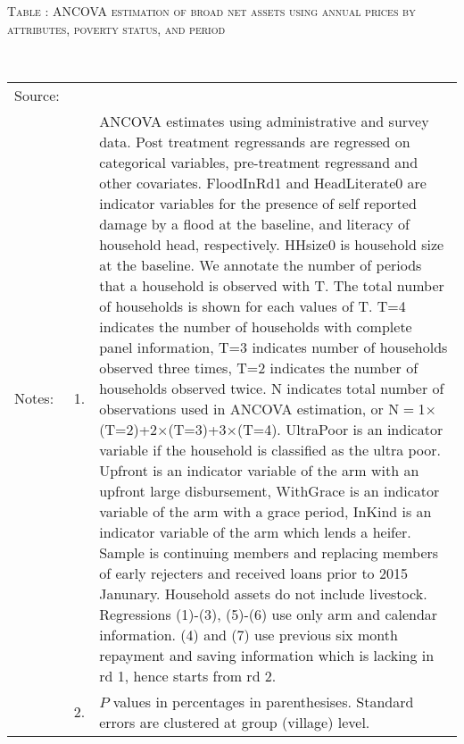 \hspace{-1cm}\begin{minipage}[t]{14cm}
\hfil\textsc{\normalsize Table \thetable: ANCOVA estimation of broad net assets using annual prices by attributes, poverty status, and period\label{tab ANCOVA net assets using annual prices timevarying poverty status attributes}}\\
\setlength{\tabcolsep}{1pt}
\setlength{\baselineskip}{8pt}
\renewcommand{\arraystretch}{.55}
\hfil{}\\
\renewcommand{\arraystretch}{.8}
\setlength{\tabcolsep}{1pt}
\begin{tabular}{>{\hfill\scriptsize}p{1cm}<{}>{\hfill\scriptsize}p{.25cm}<{}>{\scriptsize}p{12cm}<{\hfill}}
Source:& \multicolumn{2}{l}{\scriptsize Estimated with GUK administrative and survey data.}\\
Notes: & 1. & ANCOVA estimates using administrative and survey data. Post treatment regressands are regressed on categorical variables, pre-treatment regressand and other covariates. \textsf{FloodInRd1} and \textsf{HeadLiterate0} are indicator variables for the presence of self reported damage by a flood at the baseline, and literacy of household head, respectively. \textsf{HHsize0} is household size at the baseline. We annotate the number of periods that a household is observed with \textsf{T}. The total number of households is shown for each values of \textsf{T}. \textsf{T=4} indicates the number of households with complete panel information, \textsf{T=3} indicates number of households observed three times, \textsf{T=2} indicates the number of households observed twice. \textsf{N} indicates total number of observations used in ANCOVA estimation, or \textsf{N$=$1$\times$(T=2)+2$\times$(T=3)+3$\times$(T=4)}.  \textsf{UltraPoor} is an indicator variable if the household is classified as the ultra poor. \textsf{Upfront} is an indicator variable of the arm with an upfront large disbursement, \textsf{WithGrace} is an indicator variable of the arm with a grace period, \textsf{InKind} is an indicator variable of the arm which lends a heifer. Sample is continuing members and replacing members of early rejecters and received loans prior to 2015 Janunary. Household assets do not include livestock. Regressions (1)-(3), (5)-(6) use only arm and calendar information. (4) and (7) use previous six month repayment and saving information which is lacking in rd 1, hence starts from rd 2.\\
& 2. & $P$ values in percentages in parenthesises. Standard errors are clustered at group (village) level.
\end{tabular}
\end{minipage}

